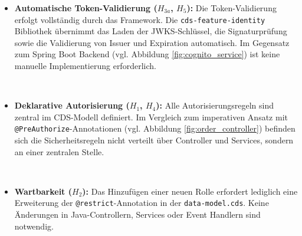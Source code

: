 \begin{itemize}
    \item \textbf{Automatische Token-Validierung ($H_{3a}$, $H_5$):} Die Token-Validierung erfolgt vollständig durch das Framework. Die \texttt{cds-feature-identity} Bibliothek übernimmt das Laden der \ac{JWKS}-Schlüssel, die Signaturprüfung sowie die Validierung von Issuer und Expiration automatisch. Im Gegensatz zum Spring Boot Backend (vgl. Abbildung \ref{fig:cognito_service}) ist keine manuelle Implementierung erforderlich.

    \item \textbf{Deklarative Autorisierung ($H_1$, $H_4$):} Alle Autorisierungsregeln sind zentral im \ac{CDS}-Modell definiert. Im Vergleich zum imperativen Ansatz mit \texttt{@PreAuthorize}-Annotationen (vgl. Abbildung \ref{fig:order_controller}) befinden sich die Sicherheitsregeln nicht verteilt über Controller und Services, sondern an einer zentralen Stelle.

    \item \textbf{Wartbarkeit ($H_2$):} Das Hinzufügen einer neuen Rolle erfordert lediglich eine Erweiterung der \texttt{@restrict}-Annotation in der \texttt{data-model.cds}. Keine Änderungen in Java-Controllern, Services oder Event Handlern sind notwendig.
\end{itemize}



